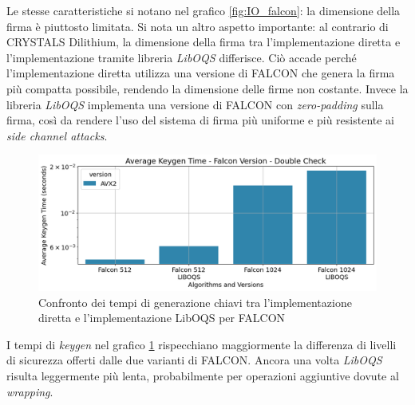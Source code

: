 Le stesse caratteristiche si notano nel grafico \ref{fig:IO_falcon}: la dimensione della firma è piuttosto limitata. Si nota un altro aspetto importante: al contrario di CRYSTALS Dilithium, la dimensione della firma tra l'implementazione diretta e l'implementazione tramite libreria \textit{LibOQS} differisce. Ciò accade perché l'implementazione diretta utilizza una versione di FALCON che genera la firma più compatta possibile, rendendo la dimensione delle firme non costante. Invece la libreria \textit{LibOQS} implementa una versione di FALCON con \textit{zero-padding} sulla firma, così da rendere l'uso del sistema di firma più uniforme e più resistente ai \textit{side channel attacks}.

\begin{figure}[H]
    \centering
    \includegraphics[width=1\textwidth]{Immagini/20240822_i9/Time_Keygen/double_check/TM_KG_falcon.png}
    \caption{Confronto dei tempi di generazione chiavi tra l'implementazione diretta e l'implementazione LibOQS per FALCON}
    \label{fig:TM_KG_falcon}
\end{figure}

I tempi di \textit{keygen} nel grafico \ref{fig:TM_KG_falcon} rispecchiano maggiormente la differenza di livelli di sicurezza offerti dalle due varianti di FALCON. Ancora una volta \textit{LibOQS} risulta leggermente più lenta, probabilmente per operazioni aggiuntive dovute al \textit{wrapping}.

